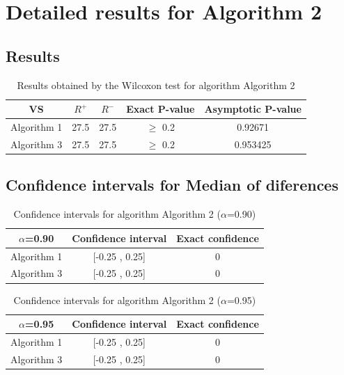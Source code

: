 \documentclass[a4paper,10pt]{article}
\begin{document}
 \clearpage 


\section{Detailed results for Algorithm 2}


\subsection{Results}

\begin{table}[!htp]
\centering\small
\begin{tabular}{
|c|c|c|c|c|}
\hline
 VS & $R^{+}$ & $R^{-}$ & Exact P-value & Asymptotic P-value \\ \hline 
Algorithm 1 & 27.5 & 27.5 & $\geq$ 0.2 & 0.92671\\ \hline 
Algorithm 3 & 27.5 & 27.5 & $\geq$ 0.2 & 0.953425\\ \hline 

\end{tabular}
\caption{Results obtained by the Wilcoxon test for algorithm Algorithm 2}
\end{table}

\subsection{Confidence intervals for Median of diferences}

\begin{table}[!htp]
\centering\small
\begin{tabular}{
|c|c|c|}
\hline
 $\alpha$=0.90 & Confidence interval & Exact confidence \\ \hline 
Algorithm 1 & [-0.25 , 0.25] & 0\\ \hline 
Algorithm 3 & [-0.25 , 0.25] & 0\\ \hline 

\end{tabular}
\caption{Confidence intervals for algorithm Algorithm 2 ($\alpha$=0.90)}
\end{table}
\begin{table}[!htp]
\centering\small
\begin{tabular}{
|c|c|c|}
\hline
 $\alpha$=0.95 & Confidence interval & Exact confidence \\ \hline 
Algorithm 1 & [-0.25 , 0.25] & 0\\ \hline 
Algorithm 3 & [-0.25 , 0.25] & 0\\ \hline 

\end{tabular}
\caption{Confidence intervals for algorithm Algorithm 2 ($\alpha$=0.95)}
\end{table}
\end{document}

